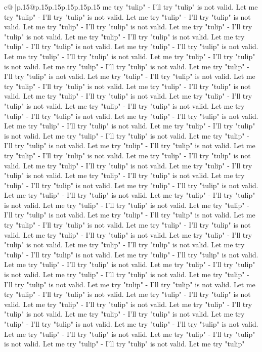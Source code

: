 \documentclass{article}
\begin{document}
{\begin{supertabular}{c@{$\;$}|p{.15\linewidth}@{}p{.15\linewidth}p{.15\linewidth}p{.15\linewidth}p{.15\linewidth}p{.15\linewidth}}
{{{me try "tulip" {-} I'll try "tulip" is not valid. Let me try "tulip" {-} I'll try "tulip" is not valid. Let me try "tulip" {-} I'll try "tulip" is not valid. Let me try "tulip" {-} I'll try "tulip" is not valid. Let me try "tulip" {-} I'll try "tulip" is not valid. Let me try "tulip" {-} I'll try "tulip" is not valid. Let me try "tulip" {-} I'll try "tulip" is not valid. Let me try "tulip" {-} I'll try "tulip" is not valid. Let me try "tulip" {-} I'll try "tulip" is not valid. Let me try "tulip" {-} I'll try "tulip" is not valid. Let me try "tulip" {-} I'll try "tulip" is not valid. Let me try "tulip" {-} I'll try "tulip" is not valid. Let me try "tulip" {-} I'll try "tulip" is not valid. Let me try "tulip" {-} I'll try "tulip" is not valid. Let me try "tulip" {-} I'll try "tulip" is not valid. Let me try "tulip" {-} I'll try "tulip" is not valid. Let me try "tulip" {-} I'll try "tulip" is not valid. Let me try "tulip" {-} I'll try "tulip" is not valid. Let me try "tulip" {-} I'll try "tulip" is not valid. Let me try "tulip" {-} I'll try "tulip" is not valid. Let me try "tulip" {-} I'll try "tulip" is not valid. Let me try "tulip" {-} I'll try "tulip" is not valid. Let me try "tulip" {-} I'll try "tulip" is not valid. Let me try "tulip" {-} I'll try "tulip" is not valid. Let me try "tulip" {-} I'll try "tulip" is not valid. Let me try "tulip" {-} I'll try "tulip" is not valid. Let me try "tulip" {-} I'll try "tulip" is not valid. Let me try "tulip" {-} I'll try "tulip" is not valid. Let me try "tulip" {-} I'll try "tulip" is not valid. Let me try "tulip" {-} I'll try "tulip" is not valid. Let me try "tulip" {-} I'll try "tulip" is not valid. Let me try "tulip" {-} I'll try "tulip" is not valid. Let me try "tulip" {-} I'll try "tulip" is not valid. Let me try "tulip" {-} I'll try "tulip" is not valid. Let me try "tulip" {-} I'll try "tulip" is not valid. Let me try "tulip" {-} I'll try "tulip" is not valid. Let me try "tulip" {-} I'll try "tulip" is not valid. Let me try "tulip" {-} I'll try "tulip" is not valid. Let me try "tulip" {-} I'll try "tulip" is not valid. Let me try "tulip" {-} I'll try "tulip" is not valid. Let me try "tulip" {-} I'll try "tulip" is not valid. Let me try "tulip" {-} I'll try "tulip" is not valid. Let me try "tulip" {-} I'll try "tulip" is not valid. Let me try "tulip" {-} I'll try "tulip" is not valid. Let me try "tulip" {-} I'll try "tulip" is not valid. Let me try "tulip" {-} I'll try "tulip" is not valid. Let me try "tulip" {-} I'll try "tulip" is not valid. Let me try "tulip" {-} I'll try "tulip" is not valid. Let me try "tulip" {-} I'll try "tulip" is not valid. Let me try "tulip" {-} I'll try "tulip" is not valid. Let me try "tulip" {-} I'll try "tulip" is not valid. Let me try "tulip" {-} I'll try "tulip" is not valid. Let me try "tulip" {-} I'll try "tulip" is not valid. Let me try "tulip" {-} I'll try "tulip" is not valid. Let me try "tulip" {-} I'll try "tulip" is not valid. Let me try "tulip" {-} I'll try "tulip" is not valid. Let me try "tulip" {-} I'll try "tulip" is not valid. Let me try "tulip" {-} I'll try "tulip" is not valid. Let me try "tulip" {-} I'll try "tulip" is not valid. Let me try "tulip" }}}
\end{supertabular}}
\end{document}
